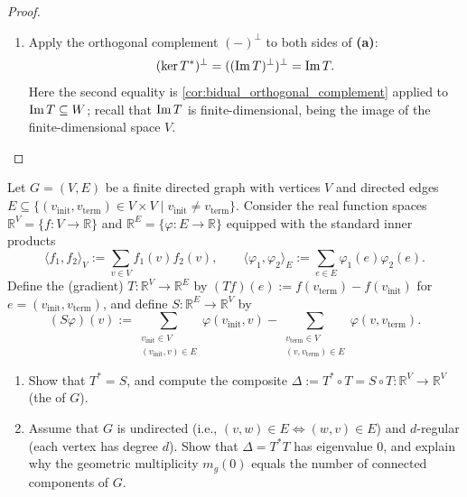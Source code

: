 \begin{proof}
\begin{enumerate}[label=\textbf{(\alph*)}]
    \item Apply the orthogonal complement $(-)^\perp$ to both sides of \textbf{(a)}:
    \[
        (\ker T^*)^\perp = ((\operatorname{Im} T)^\perp)^\perp = \operatorname{Im} T.
    \]
    Here the second equality is \cref{cor:bidual_orthogonal_complement} applied to $\operatorname{Im} T \subseteq W$; recall that $\operatorname{Im} T$ is finite-di\-men\-sional, being the image of the finite-di\-men\-sional space $V$.
\end{enumerate}
\end{proof}

\begin{exercise}
  \label{exc:graph_laplacian_adjoint}
  Let $G = (V, E)$ be a finite directed graph with vertices $V$ and directed edges $E \subseteq \{(v_{\text{init}}, v_{\text{term}}) \in V \times V \mid v_{\text{init}} \neq v_{\text{term}}\}$. Consider the real function spaces $\mathbb{R}^V = \{f \colon V \to \mathbb{R}\}$ and $\mathbb{R}^E = \{\varphi \colon E \to \mathbb{R}\}$ equipped with the standard inner products
  \[
  \langle f_1, f_2 \rangle_V := \sum_{v \in V} f_1(v) f_2(v), \qquad \langle \varphi_1, \varphi_2 \rangle_E := \sum_{e \in E} \varphi_1(e) \varphi_2(e).
  \]
  Define the  (gradient) $T \colon \mathbb{R}^V \to \mathbb{R}^E$ by $(Tf)(e) := f(v_{\text{term}}) - f(v_{\text{init}})$ for $e = (v_{\text{init}}, v_{\text{term}})$, and define $S \colon \mathbb{R}^E \to \mathbb{R}^V$ by
  \[
  (S\varphi)(v) := \sum_{\substack{v_{\text{init}} \in V \\ (v_{\text{init}}, v) \in E}} \varphi(v_{\text{init}}, v) - \sum_{\substack{v_{\text{term}} \in V \\ (v, v_{\text{term}}) \in E}} \varphi(v, v_{\text{term}}).
  \]
  \begin{enumerate}[label=\textbf{(\alph*)}]
    \item Show that $T^* = S$, and compute the composite $\Delta := T^* \circ T = S \circ T \colon \mathbb{R}^V \to \mathbb{R}^V$ (the  of $G$).
    \item Assume that $G$ is undirected (i.e., $(v, w) \in E \iff (w, v) \in E$) and $d$-regular (each vertex has degree $d$). Show that $\Delta = T^* T$ has eigenvalue $0$, and explain why the geometric multiplicity $m_g(0)$ equals the number of connected components of $G$.
  \end{enumerate}
\end{exercise}
